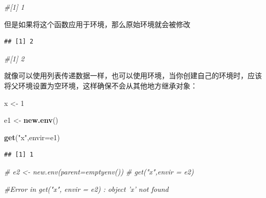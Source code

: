 \documentclass[]{book}
\newenvironment{Shaded}{\begin{snugshade}}{\end{snugshade}}
\newcommand{\KeywordTok}[1]{\textcolor[rgb]{0.13,0.29,0.53}{\textbf{#1}}}
\newcommand{\DataTypeTok}[1]{\textcolor[rgb]{0.13,0.29,0.53}{#1}}
\newcommand{\DecValTok}[1]{\textcolor[rgb]{0.00,0.00,0.81}{#1}}
\newcommand{\StringTok}[1]{\textcolor[rgb]{0.31,0.60,0.02}{#1}}
\newcommand{\CommentTok}[1]{\textcolor[rgb]{0.56,0.35,0.01}{\textit{#1}}}
\newcommand{\OperatorTok}[1]{\textcolor[rgb]{0.81,0.36,0.00}{\textbf{#1}}}
\newcommand{\NormalTok}[1]{#1}
\begin{document}
\begin{Shaded}
\begin{Highlighting}[]
\CommentTok{#[1] 1}
\end{Highlighting}
\end{Shaded}

但是如果将这个函数应用于环境，那么原始环境就会被修改

\begin{Shaded}
\end{Shaded}

\begin{verbatim}
## [1] 2
\end{verbatim}

\begin{Shaded}
\begin{Highlighting}[]
\CommentTok{#[1] 2}
\end{Highlighting}
\end{Shaded}

就像可以使用列表传递数据一样，也可以使用环境，当你创建自己的环境时，应该将父环境设置为空环境，这样确保不会从其他地方继承对象：

\begin{Shaded}
\begin{Highlighting}[]
\NormalTok{x <-}\StringTok{ }\DecValTok{1}

\NormalTok{e1 <-}\StringTok{ }\KeywordTok{new.env}\NormalTok{()}

\KeywordTok{get}\NormalTok{(}\StringTok{"x"}\NormalTok{,}\DataTypeTok{envir=}\NormalTok{e1)}
\end{Highlighting}
\end{Shaded}

\begin{verbatim}
## [1] 1
\end{verbatim}

\begin{Shaded}
\begin{Highlighting}[]
\CommentTok{# e2 <- new.env(parent=emptyenv())}
\CommentTok{# get("x",envir = e2)}

\CommentTok{#Error in get("x", envir = e2) : object 'x' not found}
\end{Highlighting}
\end{Shaded}
\end{document}
